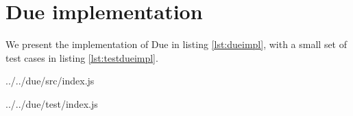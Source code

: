 \vfill\eject
\appendix

\section{Due implementation} \label{section:dueimpl}

We present the implementation of Due in listing \ref{lst:dueimpl}, with a small set of test cases in listing \ref{lst:testdueimpl}.

             {../../due/src/index.js}


             {../../due/test/index.js}






